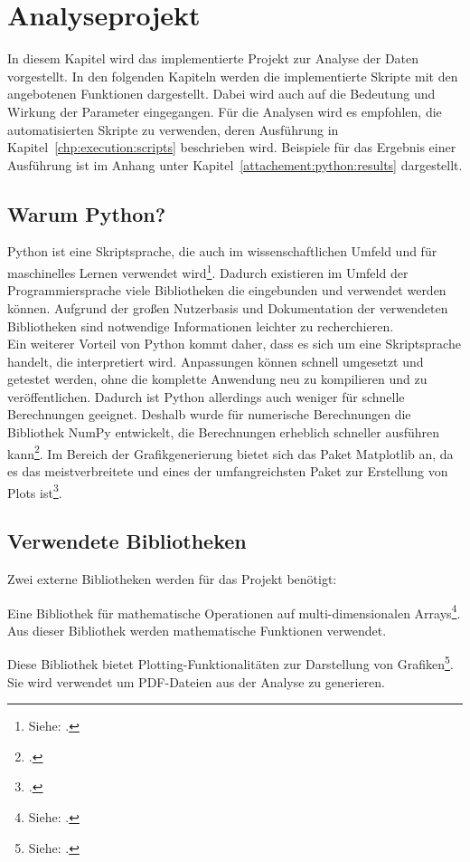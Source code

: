 \chapter{Analyseprojekt}
\label{chp:python:implementation}
In diesem Kapitel wird das implementierte Projekt zur Analyse der Daten vorgestellt.
In den folgenden Kapiteln werden die implementierte Skripte mit den angebotenen Funktionen dargestellt. 
Dabei wird auch auf die Bedeutung und Wirkung der Parameter eingegangen.
Für die Analysen wird es empfohlen, die automatisierten Skripte zu verwenden, deren Ausführung in Kapitel~\ref{chp:execution:scripts} beschrieben wird.
Beispiele für das Ergebnis einer Ausführung ist im Anhang unter Kapitel~\ref{attachement:python:results} dargestellt.

\section{Warum Python?}
Python ist eine Skriptsprache, die auch im wissenschaftlichen Umfeld und für maschinelles Lernen verwendet wird\footnote{ Siehe: \cite{Fuxjaeger2017}.}.
Dadurch existieren im Umfeld der Programmiersprache viele Bibliotheken die eingebunden und verwendet werden können.
Aufgrund der großen Nutzerbasis und Dokumentation der verwendeten Bibliotheken sind notwendige Informationen leichter zu recherchieren.\\
Ein weiterer Vorteil von Python kommt daher, dass es sich um eine Skriptsprache handelt, die interpretiert wird.
Anpassungen können schnell umgesetzt und getestet werden, ohne die komplette Anwendung neu zu kompilieren und zu veröffentlichen.
Dadurch ist Python allerdings auch weniger für schnelle Berechnungen geeignet.
Deshalb wurde für numerische Berechnungen die Bibliothek NumPy entwickelt, die Berechnungen erheblich schneller ausführen kann\footnote{ \cite[vgl.][S.173f]{Woyand2017}.}.
Im Bereich der Grafikgenerierung bietet sich das Paket Matplotlib an, da es das meistverbreitete und eines der umfangreichsten Paket zur Erstellung von Plots ist\footnote{ \cite[vgl.][S.173f]{Rossant2013}.}.

\section{Verwendete Bibliotheken}
Zwei externe Bibliotheken werden für das Projekt benötigt:
\begin{description}[style=nextline]
	\item[NumPy] Eine Bibliothek für mathematische Operationen auf multi-dimensionalen Arrays\footnote{ Siehe: \cite{Athanasias2014}.}. Aus dieser Bibliothek werden mathematische Funktionen verwendet.
	\item[Matplotlib] Diese Bibliothek bietet Plotting-Funktionalitäten zur Darstellung von Grafiken\footnote{ Siehe: \cite{Matplotlib2019}.}. Sie wird verwendet um PDF-Dateien aus der Analyse zu generieren.
\end{description}
